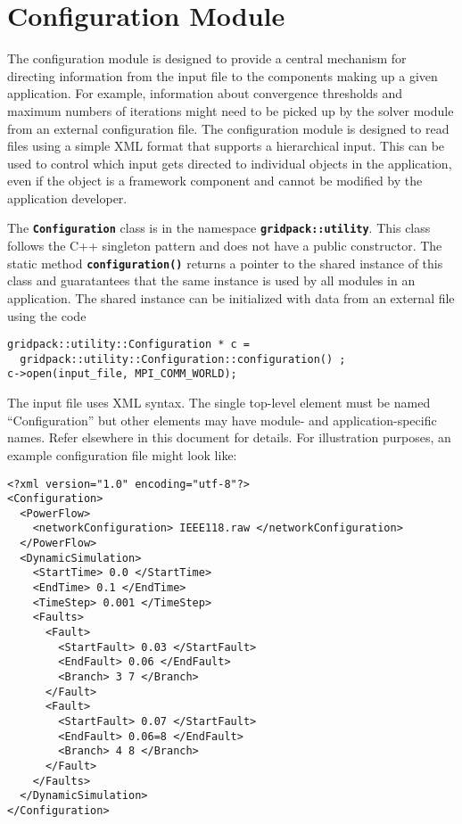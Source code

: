 \section{Configuration Module }

The configuration module is designed to provide a central mechanism for directing information from the input file to the components making up a given application. For example, information about convergence thresholds and maximum numbers of iterations might need to be picked up by the solver module from an external configuration file. The configuration module is designed to read files using a simple XML format that supports a hierarchical input. This can be used to control which input gets directed to individual objects in the application, even if the object is a framework component and cannot be modified by the application developer.

The \texttt{\textbf{Configuration}} class is in the namespace \texttt{\textbf{gridpack::utility}}. This class follows the C++ singleton pattern and does not have a public constructor. The static method \texttt{\textbf{configuration()}} returns a pointer to the shared instance of this class and guaratantees that the same instance is used by all modules in an application. The shared instance can be initialized with data from an external file using the code

{
\color{red}
\begin{Verbatim}[fontseries=b]
gridpack::utility::Configuration * c = 
  gridpack::utility::Configuration::configuration() ; 
c->open(input_file, MPI_COMM_WORLD);
\end{Verbatim}
}

The input file uses XML syntax. The single top-level element must be named ``Configuration'' but other elements may have module- and application-specific names. Refer elsewhere in this document for details.  For illustration purposes, an example configuration file might look like: 

{
\color{blue}
\bfseries
\begin{Verbatim}[commandchars=\\\{\}]
<?xml version="1.0" encoding="utf-8"?>
<Configuration>
  <PowerFlow>
    <networkConfiguration> IEEE118.raw </networkConfiguration>
  </PowerFlow>
  <DynamicSimulation>
    <StartTime> 0.0 </StartTime>
    <EndTime> 0.1 </EndTime>
    <TimeStep> 0.001 </TimeStep>
    <Faults>
      <Fault>
        <StartFault> 0.03 </StartFault>
        <EndFault> 0.06 </EndFault>
        <Branch> 3 7 </Branch>
      </Fault>
      <Fault>
        <StartFault> 0.07 </StartFault>
        <EndFault> 0.06=8 </EndFault>
        <Branch> 4 8 </Branch>
      </Fault>
    </Faults>
  </DynamicSimulation>
</Configuration>
\end{Verbatim}
}

